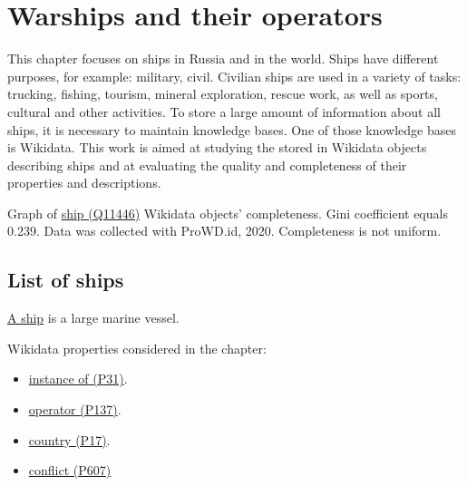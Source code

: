 \setchapterpreamble[u]{\margintoc}
\chapter{Warships and their operators\protect\footnotemark}



This chapter focuses on ships in Russia and in the world. Ships have different purposes, for example: military, civil. Civilian ships are used in a variety of tasks: trucking, fishing, tourism, mineral exploration, rescue work, as well as sports, cultural and other activities. To store a large amount of information about all ships, it is necessary to maintain knowledge bases. One of those knowledge bases is Wikidata. This work is aimed at studying the stored in Wikidata objects describing ships and at evaluating the quality and completeness of their properties and descriptions.


\begin{marginfigure}[0.0cm]
  {
    \setlength{\fboxsep}{0pt}%
    \setlength{\fboxrule}{1pt}%
  }
  \caption[Graph of Wikidata objects' completeness]{Graph of \href{https://www.wikidata.org/wiki/Q11446}{ship (Q11446)} Wikidata objects' completeness. Gini coefficient equals 0.239. Data was collected with ProWD.id, 2020. Completeness is not uniform.}%
  \label{fig:prowd_ships-unbalanced}%
\end{marginfigure}

\section{List of ships}

\href{https://en.wikipedia.org/wiki/Ship}{A ship} is a large marine vessel.



Wikidata properties considered in the chapter: 
\begin{itemize}
  \item \href{https://www.wikidata.org/wiki/Property:P31}{instance of (P31)}.
  \item \href{https://www.wikidata.org/wiki/Property:P137}{operator (P137)}.
  \item \href{https://www.wikidata.org/wiki/Property:P17}{country (P17)}.
  \item \href{https://www.wikidata.org/wiki/Property:P607}{conflict (P607)}
\end{itemize}

